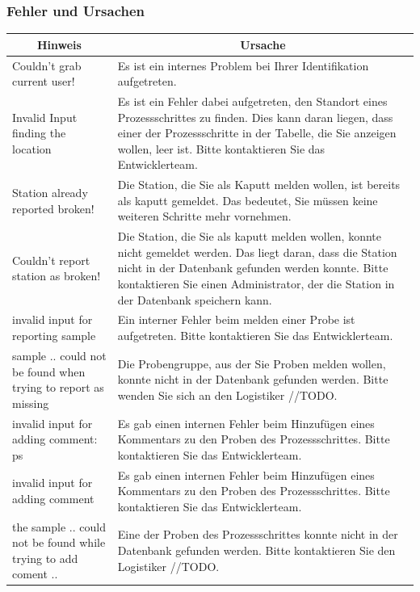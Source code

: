 \documentclass[enabledeprecatedfontcommands,fontsize=12pt,paper=a4,twoside]{scrartcl}
\begin{document}
\subsubsection{Fehler und Ursachen}
\begin{longtable}[c]{|p{5cm}|p{10cm}|}
\hline
\multicolumn{1}{|c|}{\textbf{Hinweis}}                          & \multicolumn{1}{c|}{\textbf{Ursache}}                                                                                                                                                                                                               \\ \hline
\endhead
Couldn't grab current user! & Es ist ein internes Problem bei Ihrer Identifikation aufgetreten. \\ \hline
Invalid Input finding the location & Es ist ein Fehler dabei aufgetreten, den Standort eines Prozessschrittes zu finden. Dies kann daran liegen, dass einer der Prozessschritte in der Tabelle, die Sie anzeigen wollen, leer ist. Bitte kontaktieren Sie das Entwicklerteam.  \\ \hline
Station already reported broken! & Die Station, die Sie als Kaputt melden wollen, ist bereits als kaputt gemeldet. Das bedeutet, Sie müssen keine weiteren Schritte mehr vornehmen. \\ \hline
Couldn't report station as broken! & Die Station, die Sie als kaputt melden wollen, konnte nicht gemeldet werden. Das liegt daran, dass die Station nicht in der Datenbank gefunden werden konnte. Bitte kontaktieren Sie einen Administrator, der die Station in der Datenbank speichern kann. \\ \hline
invalid input for reporting sample & Ein interner Fehler beim melden einer Probe ist aufgetreten. Bitte kontaktieren Sie das Entwicklerteam. \\ \hline
sample .. could not be found when trying to report as missing & Die Probengruppe, aus der Sie Proben melden wollen, konnte nicht in der Datenbank gefunden werden. Bitte wenden Sie sich an den Logistiker //TODO. \\ \hline
invalid input for adding comment: ps & Es gab einen internen Fehler beim Hinzufügen eines Kommentars zu den Proben des Prozessschrittes. Bitte kontaktieren Sie das Entwicklerteam.\\ \hline
invalid input for adding comment & Es gab einen internen Fehler beim Hinzufügen eines Kommentars zu den Proben des Prozessschrittes. Bitte kontaktieren Sie das Entwicklerteam.\\ \hline
the sample .. could not be found while trying to add coment .. & Eine der Proben des Prozessschrittes konnte nicht in der Datenbank gefunden werden. Bitte kontaktieren Sie den Logistiker //TODO. \\ \hline

\end{longtable}
\end{document}

